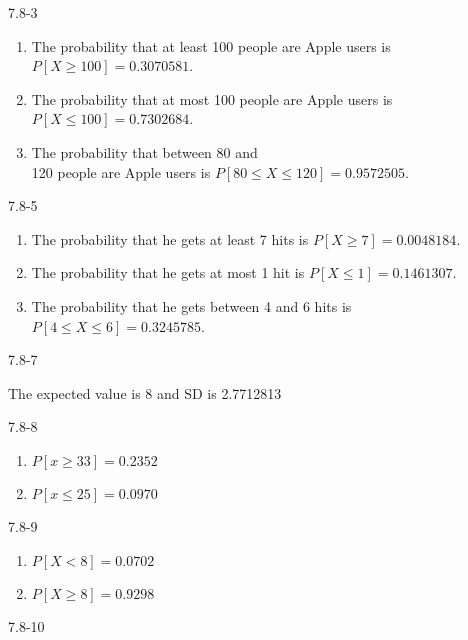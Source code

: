 \begin{exsol@solution}{7.8-3}

\begin{enumerate}
\item The probability that at least 100 people are Apple users is $P[X \ge 100] = 0.3070581$.
\item The probability that at most 100 people are Apple users is $P[X \le 100] = 0.7302684$.
\item The probability that between 80 and \\ 120 people are Apple users is $P[ 80 \le X \le 120] = 0.9572505$.
\end{enumerate}
\end{exsol@solution}
\begin{exsol@solution}{7.8-5}

\begin{enumerate}
\item The probability that he gets at least 7 hits is $P[X \ge 7] = 0.0048184$.
\item The probability that he gets at most 1 hit is $P[X \le 1] = 0.1461307$.
\item The probability that he gets between 4 and 6 hits is $P[4 \le X \le 6] = 0.3245785$.
\end{enumerate}

\end{exsol@solution}
\begin{exsol@solution}{7.8-7}

The expected value is 8 and SD is 2.7712813
\end{exsol@solution}
\begin{exsol@solution}{7.8-8}



\begin{enumerate}
\item $P[ x \ge 33] = 0.2352$
\item $P[ x \le 25] = 0.0970$
\end{enumerate}

\end{exsol@solution}
\begin{exsol@solution}{7.8-9}
\begin{enumerate}
\item $P[ X < 8 ] = 0.0702$
\item $P[ X \ge 8 ] = 0.9298$
\end{enumerate}

\end{exsol@solution}
\begin{exsol@solution}{7.8-10}

\end{exsol@solution}
